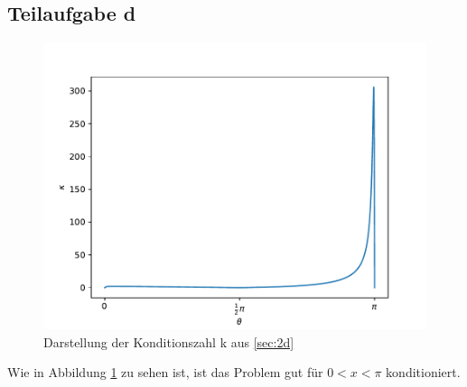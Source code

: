 \subsection{Teilaufgabe d}
\begin{figure}[H]
  \centering
  \includegraphics[width=\textwidth]{Aufgabe02/Konditionszahl.pdf}
  \caption{Darstellung der Konditionszahl k aus  \ref{sec:2d} }
  \label{fig:2d}
\end{figure}
Wie in Abbildung \ref{fig:2d} zu sehen ist, ist das Problem gut für $0<x<\pi$ konditioniert.
